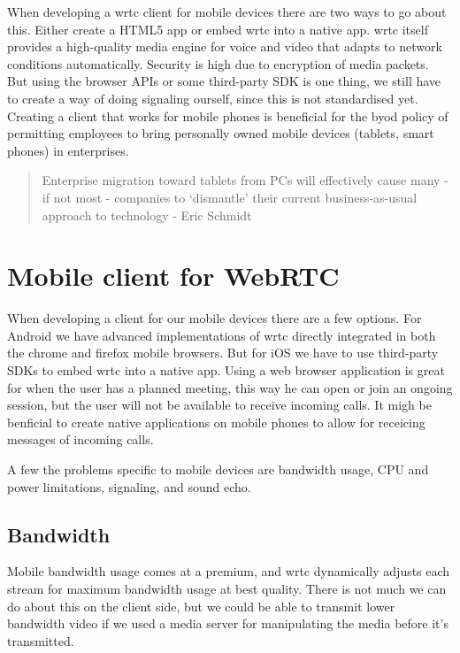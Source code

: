 When developing a \gls{wrtc} client for mobile devices there are two ways to go about this. Either create a HTML5 app or embed \gls{wrtc} into a native app. \gls{wrtc} itself provides a high-quality media engine for voice and video that adapts to network conditions automatically. Security is high due to encryption of media packets. But using the browser APIs or some third-party SDK is one thing, we still have to create a way of doing signaling ourself, since this is not standardised yet. Creating a client that works for mobile phones is beneficial for the \gls{byod} policy of permitting employees to bring personally owned mobile devices (tablets, smart phones) in enterprises.

\begin{quote}
Enterprise migration toward tablets from PCs will effectively cause many - if not most - companies to `dismantle' their current business-as-usual approach to technology - Eric Schmidt
\end{quote}


\section{Mobile client for WebRTC}
When developing a client for our mobile devices there are a few options. For Android we have advanced implementations of \gls{wrtc} directly integrated in both the chrome and firefox mobile browsers. But for iOS we have to use third-party SDKs to embed \gls{wrtc} into a native app.
Using a web browser application is great for when the user has a planned meeting, this way he can open or join an ongoing session, but the user will not be available to receive incoming calls. It migh be benficial to create native applications on mobile phones to allow for receicing messages of incoming calls.

A few the problems specific to mobile devices are bandwidth usage, CPU and power limitations, signaling, and sound echo.

\subsection{Bandwidth}
Mobile bandwidth usage comes at a premium, and \gls{wrtc} dynamically adjusts each stream for maximum bandwidth usage at best quality. There is not much we can do about this on the client side, but we could be able to transmit lower bandwidth video if we used a media server for manipulating the media before it's transmitted. 


